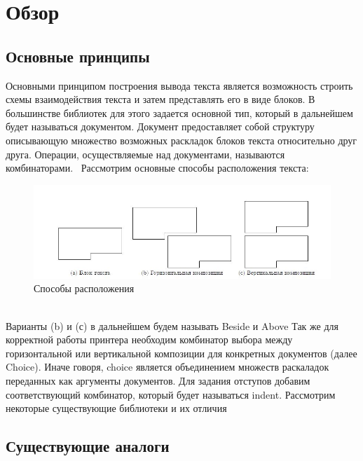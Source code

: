 \documentclass{matmex-diploma}
\begin{document}
\section{Обзор}
\subsection{Основные принципы}
Основными принципом построения вывода текста является возможность строить схемы взаимодействия текста и затем представлять его в виде блоков. В большинстве библиотек для этого задается основной тип, который в дальнейшем будет называться документом. Документ предоставляет собой структуру описывающую множество возможных раскладок блоков текста относительно друг друга. Операции, осуществляемые над документами, называются комбинаторами.~\cite{  podkopaevR}
Рассмотрим основные способы расположения текста:
\begin{figure}[h]
    \centering
    \includegraphics[scale=0.7]{Images/image10.png}
    \caption{Способы расположения}
\end{figure}
\\Варианты (b) и (с) в дальнейшем будем называть Beside и Above
Так же для корректной работы принтера необходим комбинатор выбора между горизонтальной или вертикальной композиции для конкретных документов (далее Choice). Иначе говоря, choice является объединением множеств раскаладок переданных как аргументы документов. Для задания отступов добавим соответствующий комбинатор, который будет называться indent.
Рассмотрим некоторые существующие библиотеки и их отличия
\subsection{Существующие аналоги}
\end{document}
